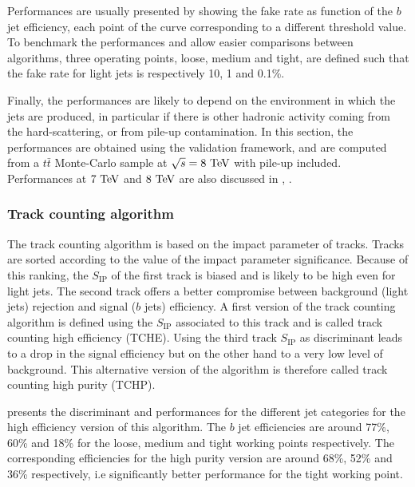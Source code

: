     Performances are usually presented by showing the fake rate as function
    of the $b$ jet efficiency, each point of the curve corresponding to a different threshold
    value. To benchmark the performances and allow easier comparisons
    between algorithms, three operating points, loose, medium and tight, are defined
    such that the fake rate for light jets is respectively 10, 1 and 0.1\%.

    Finally, the performances are likely to depend on the environment in which
    the jets are produced, in particular if there is other hadronic activity coming from
    the hard-scattering, or from pile-up contamination. In this section, the performances
    are obtained using the validation framework, and are computed from a $t\bar{t}$
    Monte-Carlo sample at $\sqrt{s} = 8~\text{TeV}$ with pile-up included. Performances at $7~\text{TeV}$
    and $8~\text{TeV}$ are also discussed in \cite{BTagging7TeV}, \cite{BTagging8TeV}.

        \subsubsection{Track counting algorithm}

    The track counting algorithm is based on the impact parameter of tracks. Tracks are
    sorted according to the value of the impact parameter significance. Because of this
    ranking, the $S_\text{IP}$ of the first track is biased and is likely to be high even
    for light jets. The second track offers a better compromise between background (light
    jets) rejection and signal ($b$ jets) efficiency. A first version of the track counting
    algorithm is defined using the $S_\text{IP}$ associated to this track and is called track
    counting high efficiency (TCHE). Using the third track $S_\text{IP}$ as discriminant
    leads to a drop in the signal efficiency but on the other hand to a very low level of
    background. This alternative version of the algorithm is therefore called track counting high
    purity (TCHP).

     presents the discriminant and
    performances for the different jet categories for the high efficiency version of this
    algorithm. The $b$ jet efficiencies are around 77\%, 60\% and 18\% for the loose, medium
    and tight working points respectively. The corresponding efficiencies for the high
    purity version are around 68\%, 52\% and 36\% respectively, i.e significantly better
    performance for the tight working point.

